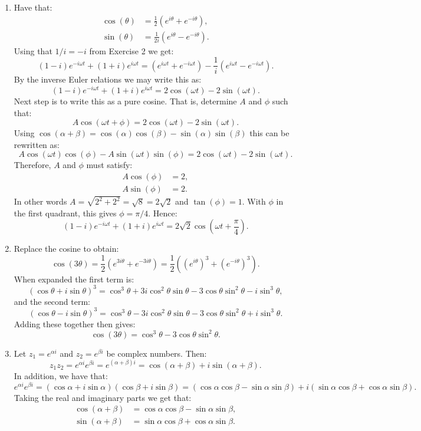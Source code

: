 \begin{enumerate}
  \item Have that:
        \begin{align*}
          \cos(\theta) & =\frac{1}{2}(e^{i\theta} + e^{-i\theta}),  \\
          \sin(\theta) & =\frac{1}{2i}(e^{i\theta} - e^{-i\theta}).
        \end{align*}
        Using that $1/i = -i$ from Exercise 2 we get:
        \[(1-i)e^{-i\omega t} + (1+i)e^{i\omega t} = (e^{i\omega t} + e^{-i\omega t}) - \frac{1}{i}(e^{i\omega t} - e^{-i\omega t}).\]
        By the inverse Euler relations we may write this as:
        \[(1-i)e^{-i\omega t} + (1+i)e^{i\omega t} = 2\cos(\omega t) - 2\sin(\omega t).\]
        Next step is to write this as a pure cosine. That is, determine $A$ and $\phi$ such that:
        \[A\cos(\omega t+\phi) = 2\cos(\omega t) - 2\sin(\omega t).\]
        Using $\cos(\alpha+\beta)=\cos(\alpha)\cos(\beta)-\sin(\alpha)\sin(\beta)$ this can be rewritten as:
        \[A\cos(\omega t)\cos(\phi) - A\sin(\omega t)\sin(\phi) = 2\cos(\omega t) - 2\sin(\omega t).\]
        Therefore, $A$ and $\phi$ must satisfy:
        \begin{align*}
          A\cos(\phi) & = 2, \\
          A\sin(\phi) & = 2.
        \end{align*}
        In other words $A=\sqrt{2^{2}+2^{2}}=\sqrt{8} = 2\sqrt{2}$ and $\tan(\phi) = 1$.
        With $\phi$ in the first quadrant, this gives $\phi=\pi/4$. Hence:
        \[(1-i)e^{-i\omega t} + (1+i)e^{i\omega t} = 2\sqrt{2}\cos\left(\omega t+\frac{\pi}{4}\right).\]

  \item Replace the cosine to obtain:
        \[\cos(3\theta) = \frac{1}{2}(e^{3i\theta} + e^{-3i\theta}) = \frac{1}{2}((e^{i\theta})^{3} + (e^{-i\theta})^{3}).\]
        When expanded the first term is:
        \[(\cos\theta + i\sin\theta)^{3} = \cos^{3}\theta + 3i\cos^{2}\theta\sin\theta - 3\cos\theta\sin^{2}\theta - i\sin^{3}\theta,\]
        and the second term:
        \[(\cos\theta - i\sin\theta)^{3} = \cos^{3}\theta - 3i\cos^{2}\theta\sin\theta - 3\cos\theta\sin^{2}\theta + i\sin^{3}\theta.\]
        Adding these together then gives:
        \[\cos(3\theta) = \cos^{3}\theta - 3\cos\theta\sin^{2}\theta.\]

  \item Let $z_{1}=e^{\alpha i}$ and $z_{2}=e^{\beta i}$ be complex numbers. Then:
        \[ z_{1}z_{2} = e^{\alpha i}e^{\beta i}=e^{(\alpha+\beta)i}=\cos(\alpha+\beta) + i\sin(\alpha+\beta). \]
        In addition, we have that:
        \[ e^{\alpha i}e^{\beta i} = (\cos\alpha + i\sin\alpha)(\cos\beta + i\sin\beta) = (\cos\alpha\cos\beta - \sin\alpha\sin\beta) + i(\sin\alpha\cos\beta + \cos\alpha\sin\beta). \]
        Taking the real and imaginary parts we get that:
        \begin{align*}
          \cos(\alpha+\beta) & = \cos\alpha\cos\beta - \sin\alpha\sin\beta, \\
          \sin(\alpha+\beta) & = \sin\alpha\cos\beta + \cos\alpha\sin\beta.
        \end{align*}


\end{enumerate}
